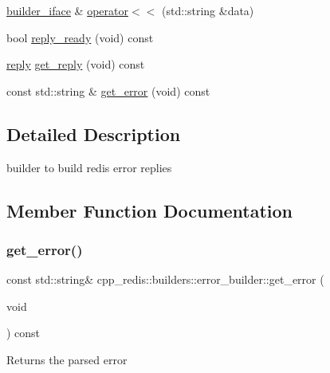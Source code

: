 \begin{DoxyCompactItemize}
\mbox{\hyperlink{classcpp__redis_1_1builders_1_1builder__iface}{builder\+\_\+iface}} \& \mbox{\hyperlink{classcpp__redis_1_1builders_1_1error__builder_af5ac542be148d6f8500de79fa3164798}{operator$<$$<$}} (std\+::string \&data)
\item 
bool \mbox{\hyperlink{classcpp__redis_1_1builders_1_1error__builder_af3d67647f012d0a7378684e2f8258a6d}{reply\+\_\+ready}} (void) const
\item 
\mbox{\hyperlink{classcpp__redis_1_1reply}{reply}} \mbox{\hyperlink{classcpp__redis_1_1builders_1_1error__builder_ae2b68b7daad4d71b6780e47bdcc1e32b}{get\+\_\+reply}} (void) const
\item 
const std\+::string \& \mbox{\hyperlink{classcpp__redis_1_1builders_1_1error__builder_adeef989fb2f5e47e001783cfda48e341}{get\+\_\+error}} (void) const
\end{DoxyCompactItemize}


\subsection{Detailed Description}
builder to build redis error replies 

\subsection{Member Function Documentation}
\mbox{\label{classcpp__redis_1_1builders_1_1error__builder_adeef989fb2f5e47e001783cfda48e341}} 
\subsubsection{\texorpdfstring{get\+\_\+error()}{get\_error()}}
{\footnotesize\ttfamily const std\+::string\& cpp\+\_\+redis\+::builders\+::error\+\_\+builder\+::get\+\_\+error (\begin{DoxyParamCaption}\item[{void}]{ }\end{DoxyParamCaption}) const}

\begin{DoxyReturn}{Returns}
the parsed error 
\end{DoxyReturn}
\mbox{\label{classcpp__redis_1_1builders_1_1error__builder_ae2b68b7daad4d71b6780e47bdcc1e32b}} 
